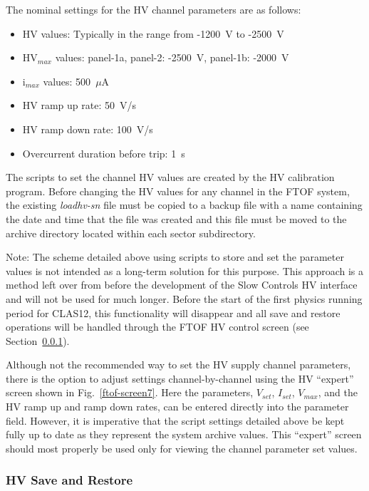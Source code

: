 \documentclass[12pt]{article}
\begin{document}
The nominal settings for the HV channel parameters are as follows:

\begin{itemize}
\item HV values: Typically in the range from -1200~V to -2500~V
\item HV$_{max}$ values: panel-1a, panel-2: -2500~V, panel-1b: -2000~V
\item i$_{max}$ values: 500~$\mu$A
\item HV ramp up rate: 50~V/s
\item HV ramp down rate: 100~V/s
\item Overcurrent duration before trip: 1~s
\end{itemize}

The scripts to set the channel HV values are created by the HV calibration program. Before changing 
the HV values for any channel in the FTOF system, the existing {\it loadhv-sn} file must be copied 
to a backup file with a name containing the date and time that the file was created and this file 
must be moved to the archive directory located within each sector subdirectory.

Note: The scheme detailed above using scripts to store and set the parameter values is not intended
as a long-term solution for this purpose. This approach is a method left over from before the 
development of the Slow Controls HV interface and will not be used for much longer. Before the start 
of the first physics running period for CLAS12, this functionality will disappear and all save and 
restore operations will be handled through the FTOF HV control screen (see Section~\ref{save-restore}).

Although not the recommended way to set the HV supply channel parameters, there is the option to 
adjust settings channel-by-channel using the HV ``expert'' screen shown in Fig.~\ref{ftof-screen7}. 
Here the parameters, $V_{set}$, $I_{set}$, $V_{max}$, and the HV ramp up and ramp down rates, can 
be entered directly into the parameter field. However, it is imperative that the script settings 
detailed above be kept fully up to date as they represent the system archive values. This ``expert'' 
screen should most properly be used only for viewing the channel parameter set values.

\subsubsection{HV Save and Restore}
\label{save-restore}
\end{document}
